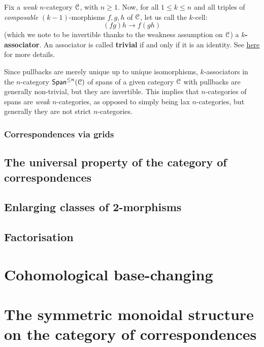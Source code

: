                 \begin{convention}[Associators]
                    Fix a \textit{weak} $n$-category $\mathcal{C}$, with $n \geq 1$. Now, for all $1 \leq k \leq n$ and all triples of \textit{composable} $(k - 1)$-morphisms $f, g, h$ of $\mathcal{C}$, let us call the $k$-cell:
                        $$(fg)h \to f(gh)$$
                    (which we note to be invertible thanks to the weakness assumption on $\mathcal{C}$) a \textbf{$k$-associator}. An associator is called \textbf{trivial} if and only if it is an identity. See \href{https://ncatlab.org/nlab/show/associator}{\underline{here}} for more details. 
                \end{convention}
                \begin{remark}
                    Since pullbacks are merely unique up to unique isomorphisms, $k$-associators in the $n$-category $\mathsf{Span}^{\leq n}(\mathcal{C})$ of spans of a given category $\mathcal{C}$ with pullbacks are generally non-trivial, but they are invertible. This implies that $n$-categories of spans are \textit{weak} $n$-categories, as opposed to simply being lax $n$-categories, but generally they are not strict $n$-categories. 
                \end{remark}
                
                \begin{proposition}
                    
                \end{proposition}
            
            \subsubsection{Correspondences via grids}
        
        \subsection{The universal property of the category of correspondences}
        
        \subsection{Enlarging classes of 2-morphisms}
        
        \subsection{Factorisation}
        
    \section{Cohomological base-changing} \label{section: cohomological_base_change}
        
    \section{The symmetric monoidal structure on the category of correspondences}